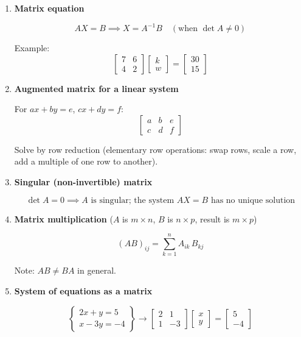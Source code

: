 \documentclass[10pt,letterpaper]{article}
\begin{document}
\begin{enumerate}
\item \textbf{Matrix equation}

$$AX = B \implies X = A^{-1}B \quad (\text{when } \det A \ne 0)$$

Example:
$$\begin{bmatrix}7 & 6 \\ 4 & 2\end{bmatrix}\begin{bmatrix}k \\ w\end{bmatrix} = \begin{bmatrix}30 \\ 15\end{bmatrix}$$

\item \textbf{Augmented matrix for a linear system}

For $ax+by=e$, $cx+dy=f$:
$$\left[\begin{array}{cc|c} a & b & e \\ c & d & f \end{array}\right]$$

Solve by row reduction (elementary row operations: swap rows, scale a row, add a multiple of one row to another).

\item \textbf{Singular (non-invertible) matrix}

$$\det A = 0 \implies A \text{ is singular; the system } AX = B \text{ has no unique solution}$$

\item \textbf{Matrix multiplication} ($A$ is $m\times n$, $B$ is $n\times p$, result is $m\times p$)

$$(AB)_{ij} = \sum_{k=1}^{n} A_{ik}\,B_{kj}$$

Note: $AB \ne BA$ in general.

\item \textbf{System of equations as a matrix}

$$\begin{Bmatrix} 2x + y = 5 \\ x - 3y = -4 \end{Bmatrix} \longrightarrow \begin{bmatrix}2 & 1 \\ 1 & -3\end{bmatrix}\begin{bmatrix}x \\ y\end{bmatrix} = \begin{bmatrix}5 \\ -4\end{bmatrix}$$

\end{enumerate}
\end{document}
